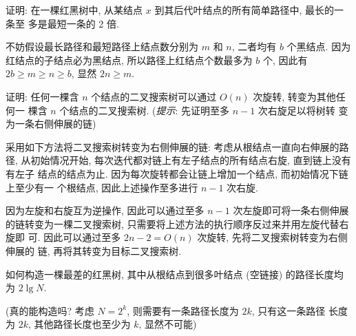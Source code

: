 \documentclass[boxes]{homework}
\begin{document}
\begin{problem}
证明: 在一棵红黑树中, 从某结点 $x$ 到其后代叶结点的所有简单路径中, 最长的一条至
多是最短一条的 2 倍.
\end{problem}
\begin{solution}
    不妨假设最长路径和最短路径上结点数分别为 $m$ 和 $n$, 二者均有 $b$ 个黑结点.
    因为红结点的子结点必为黑结点, 所以路径上红结点个数最多为 $b$ 个, 因此有
    $2b \geqslant m \geqslant n \geqslant b$, 显然 $2n \geqslant m$.
\end{solution}

\begin{problem}
证明: 任何一棵含 $n$ 个结点的二叉搜索树可以通过 $O(n)$ 次旋转, 转变为其他任何一
棵含 $n$ 个结点的二叉搜索树. (\textit{提示}: 先证明至多 $n - 1$ 次右旋足以将树转
变为一条右侧伸展的链)
\end{problem}
\begin{solution}
    采用如下方法将二叉搜索树转变为右侧伸展的链: 考虑从根结点一直向右伸展的路径,
    从初始情况开始, 每次迭代都对链上有左子结点的所有结点右旋, 直到链上没有有左子
    结点的结点为止. 因为每次旋转都会让链上增加一个结点, 而初始情况下链上至少有一
    个根结点, 因此上述操作至多进行 $n - 1$ 次右旋.

    因为左旋和右旋互为逆操作, 因此可以通过至多 $n - 1$ 次左旋即可将一条右侧伸展
    的链转变为一棵二叉搜索树, 只需要将上述方法的执行顺序反过来并用左旋代替右旋即
    可. 因此可以通过至多 $2n - 2 = O(n)$ 次旋转, 先将二叉搜索树转变为右侧伸展的
    链, 再将其转变为目标二叉搜索树.
\end{solution}

\begin{problem}
如何构造一棵最差的红黑树, 其中从根结点到很多叶结点 (空链接) 的路径长度均为
$2\lg N$.
\end{problem}
\begin{solution}
    (真的能构造吗? 考虑 $N = 2^{k}$, 则需要有一条路径长度为 $2k$, 只有这一条路径
    长度为 $2k$, 其他路径长度也至少为 $k$, 显然不可能)
\end{solution}
\end{document}
